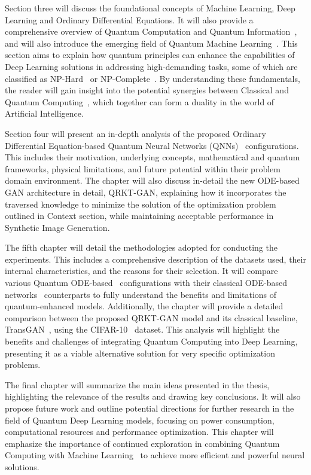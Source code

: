 \documentclass[12pt,a4paper]{report}
\begin{document}
Section three will discuss the foundational concepts of Machine Learning, Deep Learning and Ordinary Differential Equations. It will also provide a comprehensive overview of Quantum Computation and Quantum Information~\cite{nielsen2001quantum}, and will also introduce the emerging field of Quantum Machine Learning~\cite{dunjko2018machine}. This section aims to explain how quantum principles can enhance the capabilities of Deep Learning solutions in addressing high-demanding tasks, some of which are classified as NP-Hard~\cite{chatterjee2024solving} or NP-Complete~\cite{furer2008solving}. By understanding these fundamentals, the reader will gain insight into the potential synergies between Classical and Quantum Computing~\cite{nielsen2001quantum}, which together can form a duality in the world of Artificial Intelligence.

Section four will present an in-depth analysis of the proposed Ordinary Differential Equation-based Quantum Neural Networks (QNNs)~\cite{abbas2021power, li2022ode} configurations. This includes their motivation, underlying concepts, mathematical and quantum frameworks, physical limitations, and future potential within their problem domain environment. The chapter will also discuss in-detail the new ODE-based GAN architecture in detail, QRKT-GAN, explaining how it incorporates the traversed knowledge to minimize the solution of the optimization problem outlined in Context section, while maintaining acceptable performance in Synthetic Image Generation.

The fifth chapter will detail the methodologies adopted for conducting the experiments. This includes a comprehensive description of the datasets used, their internal characteristics, and the reasons for their selection. It will compare various Quantum ODE-based~\cite{fan2024Quantum} configurations with their classical ODE-based networks~\cite{zhong2022neural} counterparts to fully understand the benefits and limitations of quantum-enhanced models. Additionally, the chapter will provide a detailed comparison between the proposed QRKT-GAN model and its classical baseline, TransGAN~\cite{jiang2021transgan}, using the CIFAR-10~\cite{Krizhevsky09learningmultiple} dataset. This analysis will highlight the benefits and challenges of integrating Quantum Computing into Deep Learning, presenting it as a viable alternative solution for very specific optimization problems.

The final chapter will summarize the main ideas presented in the thesis, highlighting the relevance of the results and drawing key conclusions. It will also propose future work and outline potential directions for further research in the field of Quantum Deep Learning models, focusing on power consumption, computational resources and performance optimization. This chapter will emphasize the importance of continued exploration in combining Quantum Computing with Machine Learning~\cite{dunjko2018machine} to achieve more efficient and powerful neural solutions.
\end{document}
